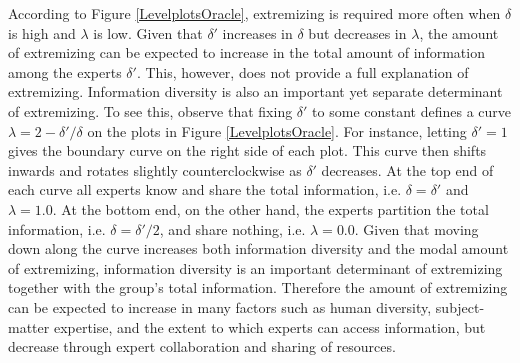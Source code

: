 \documentclass[11pt]{article}
\theoremstyle{definition}
\theoremstyle{definition}
\begin{document}
According to Figure \ref{LevelplotsOracle}, extremizing is required more often when $\delta$ is high and $\lambda$ is low. Given that $\delta'$ increases in $\delta$ but decreases in $\lambda$, the amount of extremizing can be expected to increase in the total amount of information among the experts $\delta'$. This, however, does not provide a full explanation of extremizing. Information diversity is also an important yet separate determinant of extremizing. To see this, observe that fixing $\delta'$ to some constant defines a curve $\lambda = 2 - \delta'/\delta$ on the plots in Figure \ref{LevelplotsOracle}. For instance, letting $\delta' = 1$ gives the boundary curve on the right side of each plot. This curve then shifts inwards and rotates slightly counterclockwise as $\delta'$ decreases. At the top end of each curve all experts know and share the total information, i.e. $\delta = \delta'$ and $\lambda = 1.0$.  At the bottom end, on the other hand, the experts partition the total information, i.e. $\delta = \delta'/2$, and share nothing, i.e. $\lambda = 0.0$. Given that moving down along the curve increases both information diversity and the modal amount of extremizing, information diversity is an important determinant of extremizing together with the group's total information. Therefore the amount of extremizing can be expected to increase in many factors such as human diversity, subject-matter expertise, and the extent to which experts can access information, but decrease through expert collaboration and sharing of resources. 

\end{document}
